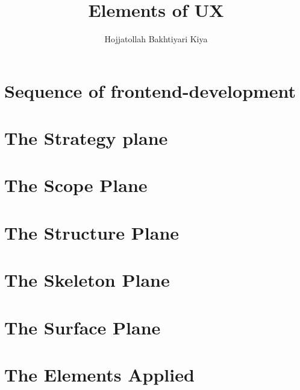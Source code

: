 \documentclass{book}
\author{Hojjatollah Bakhtiyari Kiya}
\title{Elements of UX}
\begin{document}
\maketitle
\tableofcontents
\chapter{Sequence of frontend-development} 
\chapter{The Strategy plane} 
\chapter{The Scope Plane} 
\chapter{The Structure Plane} 
\chapter{The Skeleton Plane} 
\chapter{The Surface Plane} 
\chapter{The Elements Applied} 
\end{document}
